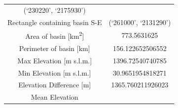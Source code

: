 \documentclass[11pt,]{article}
\begin{document}
\begin{longtable}[]{@{}cc@{}}
\begin{minipage}[t]{0.29\columnwidth}
(`230220', `2175930')\strut
\end{minipage}\tabularnewline
\begin{minipage}[t]{0.65\columnwidth}\centering\strut
Rectangle containing basin S-E\strut
\end{minipage} & \begin{minipage}[t]{0.29\columnwidth}\centering\strut
(`261000', `2131290')\strut
\end{minipage}\tabularnewline
\begin{minipage}[t]{0.65\columnwidth}\centering\strut
Area of basin {[}km\textsuperscript{2}{]}\strut
\end{minipage} & \begin{minipage}[t]{0.29\columnwidth}\centering\strut
773.5631625\strut
\end{minipage}\tabularnewline
\begin{minipage}[t]{0.65\columnwidth}\centering\strut
Perimeter of basin {[}km{]}\strut
\end{minipage} & \begin{minipage}[t]{0.29\columnwidth}\centering\strut
156.122652506552\strut
\end{minipage}\tabularnewline
\begin{minipage}[t]{0.65\columnwidth}\centering\strut
Max Elevation {[}m s.l.m.{]}\strut
\end{minipage} & \begin{minipage}[t]{0.29\columnwidth}\centering\strut
1396.72540740785\strut
\end{minipage}\tabularnewline
\begin{minipage}[t]{0.65\columnwidth}\centering\strut
Min Elevation {[}m s.l.m.{]}\strut
\end{minipage} & \begin{minipage}[t]{0.29\columnwidth}\centering\strut
30.9651954818271\strut
\end{minipage}\tabularnewline
\begin{minipage}[t]{0.65\columnwidth}\centering\strut
Elevation Difference {[}m{]}\strut
\end{minipage} & \begin{minipage}[t]{0.29\columnwidth}\centering\strut
1365.760211926023\strut
\end{minipage}\tabularnewline
\begin{minipage}[t]{0.65\columnwidth}\centering\strut
Mean Elevation\strut
\end{minipage} & \begin{minipage}[t]{0.29\columnwidth}\centering\strut

\end{minipage}
\end{longtable}
\end{document}
